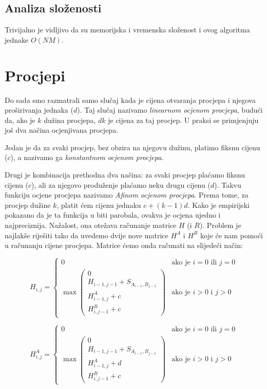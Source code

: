 \documentclass[times, utf8, zavrsni]{fer}
\begin{document}
\subsection{Analiza složenosti}
Trivijalno je vidljivo da su memorijska i vremenska složenost i ovog algoritma 
jednake $O(NM)$. 


\section{Procjepi}
Do sada smo razmatrali samo slučaj kada je cijena otvaranja procjepa i
njegova proširivanja jednaka ($d$). Taj slučaj nazivamo
\textit{linearnom ocjenom procjepa},
budući da, ako je $k$ dužina procjepa, $dk$ je cijena za taj procjep. 
U praksi se primjenjuju još dva načina ocjenjivana procjepa.

Jedan je da za svaki procjep, bez obzira na njegovu dužinu, platimo fiksnu
cijenu ($c$), a nazivamo ga \textit{konstantnom ocjenom procjepa}. 

Drugi je kombinacija prethodna dva načina: za svaki procjep plaćamo fiksnu
cijenu ($c$), ali za njegovo produženje plaćamo neku drugu cijenu ($d$).
Takvu funkciju ocjene procjepa nazivamo \textit{Afinom ocjenom procjepa}.
Prema tome, za procjep dužine $k$, platit ćem cijenu jednaku $c + (k-1)d$.
Kako je empirijski pokazano da je ta funkcija u biti parobala, ovakva je
ocjena ujedno i najpreciznija. Nažalost, ona otežava računanje matrice
$H$ (i $R$). Problem je najlakše riješiti tako da uvedemo dvije nove
matrice $H^A$ i $H^B$ koje će nam pomoći u računanju cijene procjepa.
Matrice ćemo onda računati na slijedeći način:

$$
H_{i,j} =
\left\{ \begin{array}{ll}
	0 & \mbox{ako je } i=0 \mbox{ ili } j=0 \\
	\max \left( \begin{array}{l}
		0 \\
		H_{i-1,j-1} + S_{A_{i-1}, B_{j-1}} \\
		H^A_{i-1, j} + c \\
		H^B_{i, j-1} + c
	\end{array} \right) & \mbox{ako je } i>0 \mbox{ i } j>0
\end{array} \right.
$$

$$
H^{A}_{i,j} =
\left\{ \begin{array}{ll}
	0 & \mbox{ako je } i=0 \mbox{ ili } j=0 \\
	\max \left( \begin{array}{l}
		0 \\
		H_{i-1,j-1} + S_{A_{i-1}, B_{j-1}} \\
		H^A_{i-1, j} + d \\
		H^B_{i, j-1} + c
	\end{array} \right) & \mbox{ako je } i>0 \mbox{ i } j>0
\end{array} \right.
$$
\end{document}

